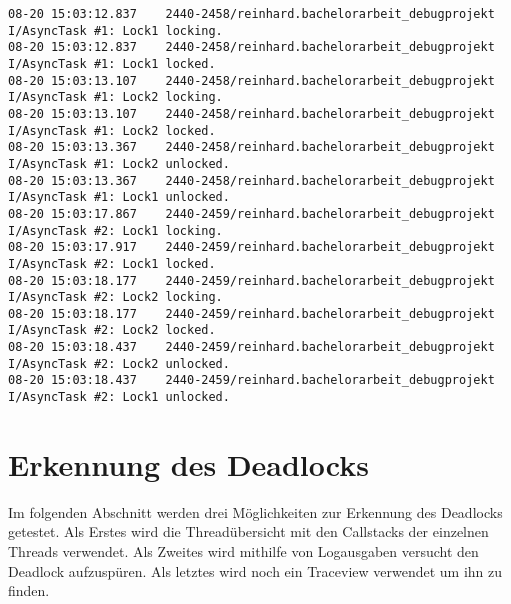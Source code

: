 \begin{lstlisting}[float,floatplacement=H,caption=Logausgaben ohne Deadlock]
08-20 15:03:12.837    2440-2458/reinhard.bachelorarbeit_debugprojekt I/AsyncTask #1: Lock1 locking.
08-20 15:03:12.837    2440-2458/reinhard.bachelorarbeit_debugprojekt I/AsyncTask #1: Lock1 locked.
08-20 15:03:13.107    2440-2458/reinhard.bachelorarbeit_debugprojekt I/AsyncTask #1: Lock2 locking.
08-20 15:03:13.107    2440-2458/reinhard.bachelorarbeit_debugprojekt I/AsyncTask #1: Lock2 locked.
08-20 15:03:13.367    2440-2458/reinhard.bachelorarbeit_debugprojekt I/AsyncTask #1: Lock2 unlocked.
08-20 15:03:13.367    2440-2458/reinhard.bachelorarbeit_debugprojekt I/AsyncTask #1: Lock1 unlocked.
08-20 15:03:17.867    2440-2459/reinhard.bachelorarbeit_debugprojekt I/AsyncTask #2: Lock1 locking.
08-20 15:03:17.917    2440-2459/reinhard.bachelorarbeit_debugprojekt I/AsyncTask #2: Lock1 locked.
08-20 15:03:18.177    2440-2459/reinhard.bachelorarbeit_debugprojekt I/AsyncTask #2: Lock2 locking.
08-20 15:03:18.177    2440-2459/reinhard.bachelorarbeit_debugprojekt I/AsyncTask #2: Lock2 locked.
08-20 15:03:18.437    2440-2459/reinhard.bachelorarbeit_debugprojekt I/AsyncTask #2: Lock2 unlocked.
08-20 15:03:18.437    2440-2459/reinhard.bachelorarbeit_debugprojekt I/AsyncTask #2: Lock1 unlocked.
\end{lstlisting}


\section{Erkennung des Deadlocks}
Im folgenden Abschnitt werden drei Möglichkeiten zur Erkennung des Deadlocks getestet. Als Erstes wird die Threadübersicht mit den Callstacks der einzelnen Threads verwendet. Als Zweites wird mithilfe von Logausgaben versucht den Deadlock aufzuspüren. Als letztes wird noch ein Traceview verwendet um ihn zu finden.

